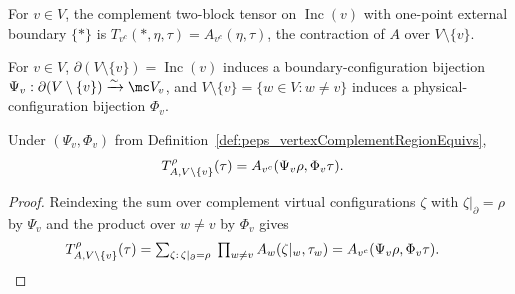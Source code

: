 \begin{definition}%
    \label{def:peps_complementTwoBlock}
    \leanok
    For $v\in V$, the complement two-block tensor on $\operatorname{Inc}(v)$
    with one-point external boundary $\{*\}$ is
    $T_{v^c}(*,\eta,\tau)=A_{v^c}(\eta,\tau)$, the contraction of $A$ over
    $V\setminus\{v\}$.
\end{definition}

\begin{definition}%
    \label{def:peps_vertexComplementRegionEquivs}
    \leanok
    For $v\in V$, $\partial(V\setminus\{v\})=\operatorname{Inc}(v)$ induces a
    boundary-configuration bijection $\Psi_v:\partial(V\setminus\{v\})\xrightarrow{\sim}\mc V_v$,
    and $V\setminus\{v\}=\{w\in V:w\ne v\}$ induces a physical-configuration
    bijection $\Phi_v$.
\end{definition}

\begin{lemma}%
    \label{thm:peps_regionBlockedWeight_vertexComplement}
    \leanok
    Under $(\Psi_v,\Phi_v)$ from Definition~\ref{def:peps_vertexComplementRegionEquivs},
    \begin{align}
        T_{A,V\setminus\{v\}}^{\rho}(\tau)
         & =
        A_{v^c}(\Psi_v\rho,\Phi_v\tau).
        \notag
    \end{align}
\end{lemma}
\begin{proof}\leanok
    Reindexing the sum over complement virtual configurations $\zeta$ with
    $\zeta|_{\partial}=\rho$ by $\Psi_v$ and the product over $w\ne v$ by
    $\Phi_v$ gives
    \begin{align}
        T_{A,V\setminus\{v\}}^{\rho}(\tau)
         & =
        \textstyle
        \sum_{\zeta:\,\zeta|_{\partial}=\rho}\;
        \prod_{w\neq v} A_w(\zeta|_w,\tau_w)
        =
        A_{v^c}(\Psi_v\rho,\Phi_v\tau).
        \notag
    \end{align}
\end{proof}

